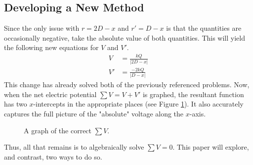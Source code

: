 \documentclass[titlepage]{article}
\begin{document}
\subsection*{Developing a New Method}
Since the only issue with $r=2D-x$ and $r'=D-x$ is that the quantities are occasionally negative, take the absolute value of both quantities. This will yield the following new equations for $V$ and $V'$.
\begin{align}
    V &= \frac{kQ}{|2D-x|}\label{eqn:Vnew}\\
    V' &= \frac{-2kQ}{|D-x|}\label{eqn:VprimeNew}
\end{align}
This change has already solved both of the previously referenced problems. Now, when the net electric potential $\sum V = V+V'$ is graphed, the resultant function has two $x$-intercepts in the appropriate places (see Figure \ref{fig:absGraph}). It also accurately captures the full picture of the "absolute" voltage along the $x$-axis.

\begin{figure}[h!]
    \centering
    \caption{A graph of the correct $\sum V$.}
    \label{fig:absGraph}
\end{figure}

Thus, all that remains is to algebraically solve $\sum V = 0$. This paper will explore, and contrast, two ways to do so.
\end{document}
